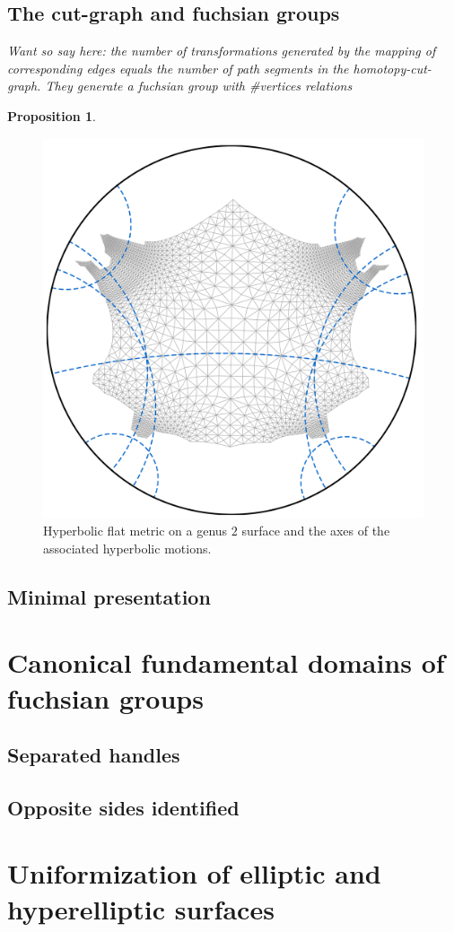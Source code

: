 \documentclass{book}
\newtheorem{proposition}{Proposition}
\begin{document}
\subsection{The cut-graph and fuchsian groups}
\emph{Want so say here: the number of transformations generated by the mapping of corresponding edges equals the number of path segments in the homotopy-cut-graph. They generate a fuchsian group with \#vertices relations}

\begin{proposition}
	
\end{proposition}

\begin{figure}
\centering
\includegraphics[width=0.4\linewidth]{cutCuttedBrezel01}
\caption{Hyperbolic flat metric on a genus $2$ surface and the axes of the associated hyperbolic motions.}
\label{fig:axes_of_motion}
\end{figure}

\subsection{Minimal presentation}

\section{Canonical fundamental domains of fuchsian groups}
\subsection{Separated handles}
\subsection{Opposite sides identified}

\section{Uniformization of elliptic and hyperelliptic surfaces}
\end{document}

